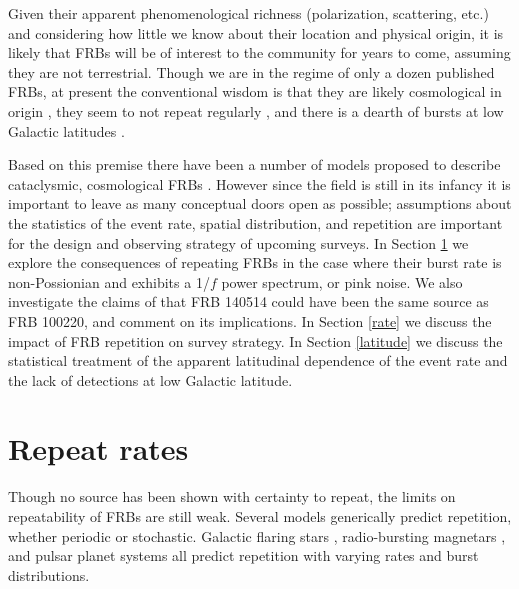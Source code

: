 \documentclass[useAMS,usenatbib]{mn2e}
\begin{document}
Given their apparent phenomenological richness
(polarization, scattering, etc.) and considering
how little we know about their location and physical 
origin, it is likely that FRBs will be of interest to the community for 
years to come, assuming they are not terrestrial.
Though we are in the regime of only a dozen published FRBs, 
at present the conventional wisdom is that they are likely cosmological
in origin \citep{2013Sci...341...53T}, they seem to not repeat regularly
\citep{2015MNRAS.454..457P}, and there is a dearth of bursts 
at low Galactic latitudes \citep{2014ApJ...789L..26P, 2014ApJ...792...19B, 2015MNRAS.451.3278M}.

Based on this premise there have been 
a number of models proposed to describe cataclysmic, cosmological 
FRBs \citep{2012ApJ...760...64M, 2013PASJ...65L..12T, 2014A&A...562A.137F, 2015ApJ...814L..20M}.
However since the field is still in its infancy it is important to
leave as many conceptual doors open as possible;
assumptions about the statistics of the event rate, 
spatial distribution, and repetition are important for the design
and observing strategy of upcoming surveys. In Section \ref{repeat} we explore the 
consequences of repeating FRBs in the case where their 
burst rate is non-Possionian and exhibits a 1/$f$ power spectrum, 
or pink noise. We also investigate the claims of \cite{2015arXiv150701002M}
that FRB 140514 could have been the same source as FRB 100220, 
and comment on its implications. In Section \ref{rate} we
discuss the impact of FRB repetition on survey strategy. In Section \ref{latitude}
we discuss the statistical treatment of the apparent latitudinal dependence 
of the event rate and the lack of detections at low Galactic latitude.


\section{Repeat rates}
\label{repeat}

Though no source has been shown with certainty to repeat, 
the limits on repeatability of FRBs are still weak. Several 
models generically predict repetition, whether periodic or stochastic. 
Galactic flaring stars \citep{2015arXiv150701002M}, radio-bursting 
magnetars \citep{2007arXiv0710.2006P, 2015ApJ...807..179P}, and pulsar planet systems 
\citep{2014A&A...569A..86M} all predict repetition with varying 
rates and burst distributions. 
\end{document}
